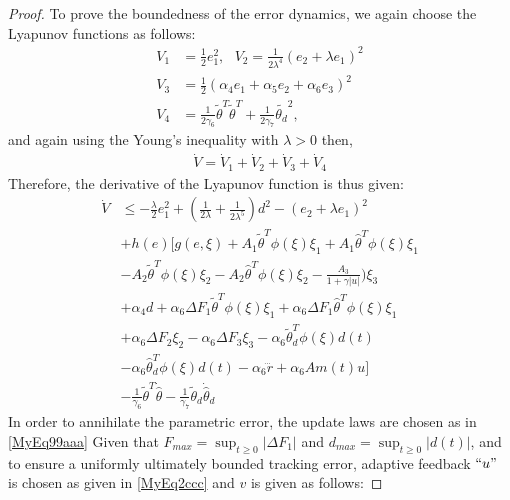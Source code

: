 \documentclass[10pt,a4paper]{amsart}
\begin{document}
\begin{proof}
To prove the boundedness of the error dynamics, we again choose the Lyapunov functions as follows:
\begin{equation} \label{MyEq88}
  \begin{split}
  V_1 &= \tfrac{1}{2}e_1^2,\ \ \ V_2=\tfrac{1}{2\lambda^4}(e_2+\lambda e_1)^2\\
   V_3 &=\tfrac{1}{2}(\alpha_4 e_1 + \alpha_5 e_2 + \alpha_6 e_3)^2\\ V_4 &=\tfrac{1}{2\gamma_6}{\tilde{\theta}}^T{\tilde{\theta}}^T+\tfrac{1}{2\gamma_7}{\tilde{\theta_d}}^2,
  \end{split}
\end{equation}
and again using the Young's inequality with  $\lambda >0$ then,
\begin{equation} \label{MyEq103}
  \begin{split}
  {\dot V}= {\dot V_1}+{\dot V_2}+{\dot V_3}+{\dot V_4}
  \end{split}
\end{equation}
Therefore, the derivative of the Lyapunov function is thus given:
\begin{equation} \label{MyEq104}
  \begin{split}
  {\dot V} & \leq  -\tfrac{\lambda}{2} e_1^2+ (\tfrac{1}{2\lambda}+\tfrac{1}{2\lambda^5})d^2-(e_2+ \lambda e_1)^2\\
  &+ h(e)[g(e,\xi)+A_1\tilde{\theta}^T\phi(\xi)\xi_1+A_1{\hat\theta}^T\phi(\xi)\xi_1\\
  &-A_2\tilde{\theta}^T\phi(\xi)\xi_2-A_2{\hat\theta}^T\phi(\xi)\xi_2-\tfrac{A_3}{1+\gamma \lvert u \rvert})\xi_3 \\
  &+ \alpha_4d+  \alpha_6\Delta F_1\tilde{\theta}^T\phi(\xi)\xi_1+\alpha_6\Delta F_1{\hat\theta}^T\phi(\xi)\xi_1\\
  &+\alpha_6\Delta F_2\xi_2-\alpha_6\Delta F_3\xi_3-\alpha_6\tilde{\theta}_d^T\phi(\xi)d(t)\\
  &-\alpha_6{\hat\theta}_d^T\phi(\xi)d(t)-\alpha_6{\dddot r} + \alpha_6Am(t)u]\\
   &-\tfrac{1}{\gamma_6}{\tilde{\theta}}^T{\dot {\hat \theta}}-\tfrac{1}{\gamma_7}\tilde{\theta}_d{\dot {\hat \theta}_d}
  \end{split}
\end{equation}
In order to annihilate the parametric error, the update laws are chosen as in \eqref{MyEq99aaa}
Given that $F_{max}=\sup_{t \geq 0}|\Delta F_1|$ and $d_{max}= \sup_{t \geq 0}|d(t)|$, and to ensure a uniformly ultimately bounded tracking error, adaptive feedback $``u"$ is chosen as given in \eqref{MyEq2ccc} and $v$ is given as follows:

\end{proof}
\end{document}
